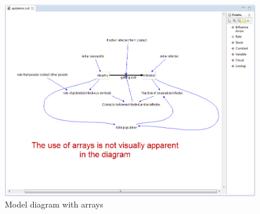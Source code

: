 \documentclass[11pt]{amsart}
\begin{document}
\begin{figure}[ht]
\begin{center}
\vspace{.2in}
\centerline {
\includegraphics[totalheight=0.35\textheight]{images/060.jpg}
}
\caption{Model diagram with arrays}
\label{fig:060}
\end{center}
\end{figure}
\end{document}
